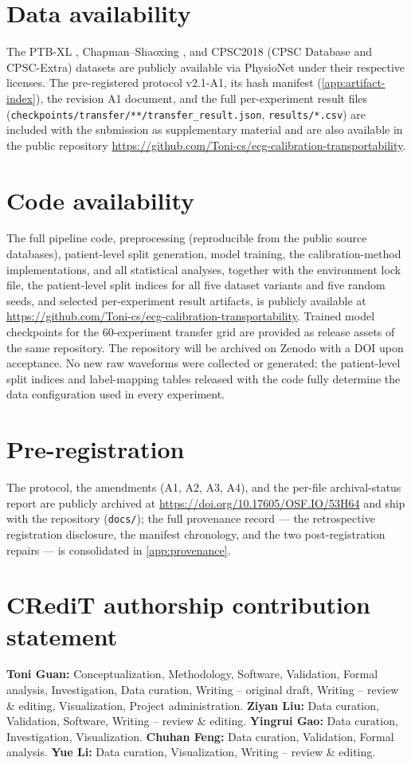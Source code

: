 \documentclass[review,12pt,nonatbib]{elsarticle}
\begin{document}
\section*{Data availability}
The PTB-XL \cite{wagner2020ptbxl}, Chapman--Shaoxing
\cite{zheng2022ecgarrhythmia}, and CPSC2018 (CPSC Database and CPSC-Extra)
\cite{liu2018cpsc,physionet2020cpsc} datasets are publicly
available via PhysioNet under their respective licenses. The
pre-registered protocol v2.1-A1, its hash manifest
(\ref{app:artifact-index}), the revision A1 document,
and the full per-experiment result files
(\texttt{checkpoints/transfer/**/}\allowbreak\texttt{transfer\_result.json},
\texttt{results/*.csv}) are included with the submission as
supplementary material and are also available in the public repository
\url{https://github.com/Toni-cs/ecg-calibration-transportability}.
\section*{Code availability}
The full pipeline code, preprocessing (reproducible from the
public source databases), patient-level split generation, model
training, the calibration-method implementations, and all statistical
analyses, together with the environment lock file, the patient-level
split indices for all five dataset variants and five random seeds, and
selected per-experiment result artifacts, is publicly available at
\url{https://github.com/Toni-cs/ecg-calibration-transportability}.
Trained model checkpoints for the 60-experiment transfer grid are
provided as release assets of the same repository. The repository will
be archived on Zenodo with a DOI upon acceptance. No new raw
waveforms were collected or generated; the patient-level split
indices and label-mapping tables released with the code fully
determine the data configuration used in every experiment.

\section*{Pre-registration}
The protocol, the amendments (A1, A2, A3, A4), and the per-file
archival-status report are publicly archived at
\url{https://doi.org/10.17605/OSF.IO/53H64} and ship with the repository
(\texttt{docs/}); the full provenance record --- the retrospective registration disclosure, the manifest chronology, and the two
post-registration repairs --- is consolidated in
\ref{app:provenance}.
\section*{CRediT authorship contribution statement}
\textbf{Toni Guan:} Conceptualization, Methodology, Software, Validation,
Formal analysis, Investigation, Data curation, Writing -- original draft,
Writing -- review \& editing, Visualization, Project administration.
\textbf{Ziyan Liu:} Data curation, Validation, Software, Writing -- review \& editing.
\textbf{Yingrui Gao:} Data curation, Investigation, Visualization.
\textbf{Chuhan Feng:} Data curation, Validation, Formal analysis.
\textbf{Yue Li:} Data curation, Visualization, Writing -- review \& editing.
\end{document}
